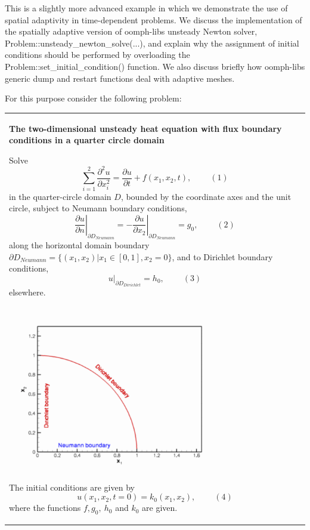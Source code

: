 This is a slightly more advanced example in which we demonstrate the use of spatial adaptivity in time-\/dependent problems. We discuss the implementation of the spatially adaptive version of {\ttfamily oomph-\/lib\textquotesingle{}s} unsteady Newton solver, {\ttfamily Problem\+::unsteady\+\_\+newton\+\_\+solve}(...), and explain why the assignment of initial conditions should be performed by overloading the {\ttfamily Problem\+::set\+\_\+initial\+\_\+condition()} function. We also discuss briefly how {\ttfamily oomph-\/lib\textquotesingle{}s} generic dump and restart functions deal with adaptive meshes.

For this purpose consider the following problem\+:

\begin{center} \tabulinesep=1mm
\begin{longtabu} spread 0pt [c]{*{1}{|X[-1]}|}
\hline
\begin{center} {\bfseries The two-\/dimensional unsteady heat equation with flux boundary conditions in a quarter circle domain} \end{center}  Solve \[ \sum_{i=1}^2\frac{\partial^2 u}{\partial x_i^2} = \frac{\partial u}{\partial t} + f\left(x_1,x_2,t\right), \ \ \ \ \ \ \ \ \ \ (1) \] in the quarter-\/circle domain $ D $, bounded by the coordinate axes and the unit circle, subject to Neumann boundary conditions, \[ \left. \frac{\partial u}{\partial n}\right|_{\partial D_{Neumann}}= - \left. \frac{\partial u}{\partial x_2}\right|_{\partial D_{Neumann}}= g_0, \ \ \ \ \ \ \ \ \ \ (2) \] along the horizontal domain boundary $ \partial D_{Neumann} = \{ (x_1,x_2) | x_1 \in [0,1], x_2=0 \} $, and to Dirichlet boundary conditions, \[ \left. u\right|_{\partial D_{Dirichlet}}=h_0, \ \ \ \ \ \ \ \ \ \ (3) \] elsewhere.  
\begin{DoxyImage}
\includegraphics[width=0.75\textwidth]{domain}
\end{DoxyImage}
 The initial conditions are given by \[ u(x_1,x_2,t=0)=k_0(x_1,x_2), \ \ \ \ \ \ \ \ \ \ (4) \] where the functions $ f, g_0, \ h_0$ and $ k_0$ are given.   \\
\end{longtabu}
\end{center} 

